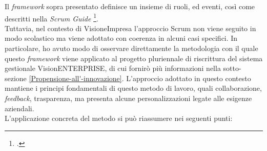 Il \textit{framework} sopra presentato definisce un insieme di ruoli, ed eventi, così come descritti nella \textit{Scrum Guide} \footcite{misc:Guida-Scrum}. \\
Tuttavia, nel contesto di VisioneImpresa l'approccio Scrum non viene seguito in modo scolastico ma viene adottato con coerenza in alcuni casi specifici. 
In particolare, ho avuto modo di osservare direttamente la metodologia con il quale questo \textit{framework} viene applicato al progetto pluriennale di riscrittura del sistema gestionale VisionENTERPRISE, di cui fornirò più informazioni nella sotto-sezione \ref{Propensione-all'-innovazione}.
L'approccio adottato in questo contesto mantiene i principi fondamentali di questo metodo di lavoro, quali collaborazione, \textit{feedback}, trasparenza, ma presenta alcune personalizzazioni legate alle esigenze aziendali. \\
L'applicazione concreta del metodo si può riassumere nei seguenti punti:

